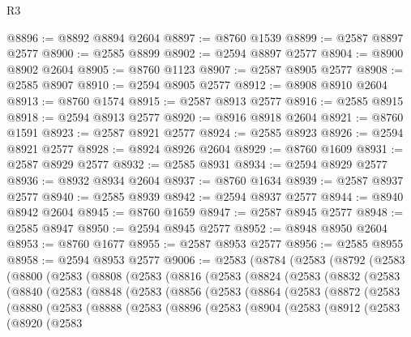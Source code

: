 \begin{lexlean}{R3}
\begin{coremodule}
@8896 := @8892 @8894 @2604
@8897 := @8760 @1539
@8899 := @2587 @8897 @2577
@8900 := @2585 @8899
@8902 := @2594 @8897 @2577
@8904 := @8900 @8902 @2604
@8905 := @8760 @1123
@8907 := @2587 @8905 @2577
@8908 := @2585 @8907
@8910 := @2594 @8905 @2577
@8912 := @8908 @8910 @2604
@8913 := @8760 @1574
@8915 := @2587 @8913 @2577
@8916 := @2585 @8915
@8918 := @2594 @8913 @2577
@8920 := @8916 @8918 @2604
@8921 := @8760 @1591
@8923 := @2587 @8921 @2577
@8924 := @2585 @8923
@8926 := @2594 @8921 @2577
@8928 := @8924 @8926 @2604
@8929 := @8760 @1609
@8931 := @2587 @8929 @2577
@8932 := @2585 @8931
@8934 := @2594 @8929 @2577
@8936 := @8932 @8934 @2604
@8937 := @8760 @1634
@8939 := @2587 @8937 @2577
@8940 := @2585 @8939
@8942 := @2594 @8937 @2577
@8944 := @8940 @8942 @2604
@8945 := @8760 @1659
@8947 := @2587 @8945 @2577
@8948 := @2585 @8947
@8950 := @2594 @8945 @2577
@8952 := @8948 @8950 @2604
@8953 := @8760 @1677
@8955 := @2587 @8953 @2577
@8956 := @2585 @8955
@8958 := @2594 @8953 @2577
@9006 := @2583
    (@8784
      (@2583
        (@8792
          (@2583
            (@8800
              (@2583
                (@8808
                  (@2583
                    (@8816
                      (@2583
                        (@8824
                          (@2583
                            (@8832
                              (@2583
                                (@8840
                                  (@2583
                                    (@8848
                                      (@2583
                                        (@8856
                                          (@2583
                                            (@8864
                                              (@2583
                                                (@8872
                                                  (@2583
                                                    (@8880
                                                      (@2583
                                                        (@8888
                                                          (@2583
                                                            (@8896
                                                              (@2583
                                                                (@8904
                                                                  (@2583
                                                                    (@8912
                                                                      (@2583
                                                                        (@8920
                                                                          (@2583

\end{coremodule}
\end{lexlean}
